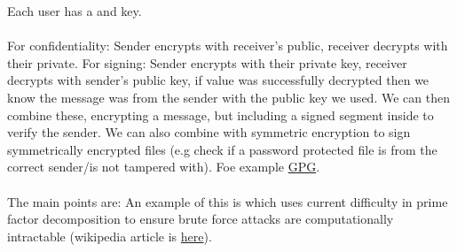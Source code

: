 \documentclass{report}
\begin{document}
         {
            Each user has a  and  key.
            \\
            \\ For confidentiality: Sender encrypts with receiver's public, receiver decrypts with their private.
            For signing: Sender encrypts with their private key, receiver decrypts with sender's public key, if value was successfully decrypted then we know the message was from the sender with the public key we used.
            We can then combine these, encrypting a message, but including a signed segment inside to verify the sender. We can also combine with symmetric encryption to sign symmetrically encrypted files (e.g check if a password protected file is from the correct sender/is not tampered with). Foe example \href{https://gnupg.org/}{GPG}.
            \\
            \\ The main points are:
            An example of this is  which uses current difficulty in prime factor decomposition to ensure brute force attacks are computationally intractable (wikipedia article is \href{https://en.wikipedia.org/wiki/RSA_(cryptosystem)}{here}).
        }
\end{document}

